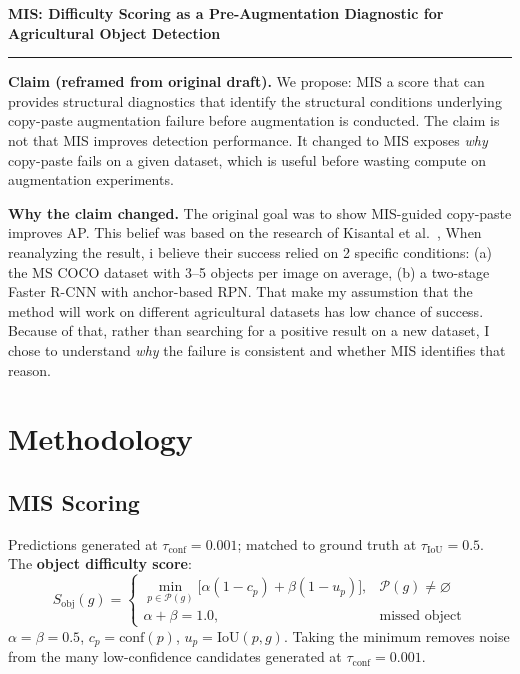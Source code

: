 \documentclass[10pt, a4paper]{article}
\begin{document}
\begin{center}
  {\large\textbf{MIS: Difficulty Scoring as a Pre-Augmentation Diagnostic
    for Agricultural Object Detection}}\\[4pt]
\end{center}
\rule{\linewidth}{1pt}
\vspace{2pt}

\textbf{Claim (reframed from original draft).}
We propose: MIS a score that can provides structural diagnostics
 that identify the structural conditions underlying
copy-paste augmentation failure before augmentation is conducted.
The claim is not that MIS improves detection performance.
It changed to MIS exposes \emph{why} copy-paste fails on a given dataset,
which is useful before wasting compute on augmentation experiments.

\textbf{Why the claim changed.}
The original goal was to show MIS-guided copy-paste improves AP.
This belief was based on the research of Kisantal et al.\ \cite{kisantal2019},
When reanalyzing the result, i believe their success
relied on 2 specific conditions: (a) the MS COCO dataset with 3–5 objects per image on
average, (b) a two-stage Faster R-CNN with anchor-based RPN.
That make my assumstion that the method will work on different agricultural datasets has 
low chance of success. Because of that,
rather than searching for a positive result on a new dataset,
I chose to understand \emph{why} the failure is consistent and
whether MIS identifies that reason.

\section{Methodology}

\subsection{MIS Scoring}

Predictions generated at $\tau_{\text{conf}}=0.001$; matched to
ground truth at $\tau_{\text{IoU}}=0.5$.
The \textbf{object difficulty score}:
\begin{equation}
  S_{\text{obj}}(g) = \begin{cases}
    \min_{p \in \mathcal{P}(g)}
      \bigl[\alpha(1 - c_p) + \beta(1 - u_p)\bigr],
      & \mathcal{P}(g) \neq \varnothing \\
    \alpha + \beta = 1.0, & \text{missed object}
  \end{cases}
\end{equation}
$\alpha=\beta=0.5$, $c_p=\text{conf}(p)$, $u_p=\text{IoU}(p,g)$.
Taking the minimum removes noise from the many low-confidence candidates
generated at $\tau_{\text{conf}}=0.001$.
\end{document}
